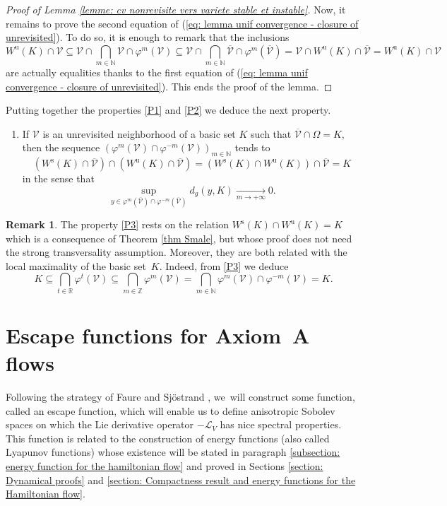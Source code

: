 \documentclass[11pt]{article}
\newcommand{\rs}{\mathrm{s}}
\newcommand{\ru}{\mathrm{u}}
\theoremstyle{definition}
\newtheorem{remark}[definition]{Remark}
\theoremstyle{plain}
\newcommand{\Lie}{\mathcal{L}}
\newcommand{\N}{\mathbb{N}}
\newcommand{\R}{\mathbb{R}}
\newcommand{\Vcal}{\mathcal{V}}
\newcommand{\Z}{\mathbb{Z}}
\begin{document}
\begin{proof}[Proof of Lemma \ref{lemme: cv nonrevisite vers variete stable et instable}]
Now, it remains to prove the second equation of (\ref{eq: lemma unif convergence - closure of unrevisited}). To do so, it is enough to remark that the inclusions
\[
W^\ru (K) \cap \Vcal \subseteq \Vcal \cap \bigcap_{m \in \N} \Vcal \cap \varphi^m (\Vcal) \subseteq \Vcal \cap \bigcap_{m \in \N} \overline{\Vcal} \cap \varphi^m (\overline{\Vcal}) =\Vcal \cap W^\ru (K) \cap \overline{\Vcal} = W^\ru (K) \cap \Vcal
\]
are actually equalities thanks to the first equation of (\ref{eq: lemma unif convergence - closure of unrevisited}). This ends the proof of the lemma.
\end{proof}

Putting together the properties \eqref{P1} and \eqref{P2} we deduce the next property.

\begin{enumerate}\renewcommand{\theenumi}{{P\arabic{enumi}}}\setcounter{enumi}{2}
\item\label{P3}
If $\Vcal$ is an unrevisited neighborhood of a basic set $K$ such that $\overline{\Vcal} \cap \Omega = K$, then the sequence $(\varphi^m (\Vcal) \cap \varphi^{-m} (\Vcal))_{m \in \N}$ tends to
\[
\left(W^\rs (K) \cap \overline{\Vcal} \right) \cap \left(W^\ru (K) \cap \overline{\Vcal} \right) = (W^\rs (K) \cap W^\ru (K))\cap \overline{\Vcal} = K
\]
in the sense that
\[
\sup_{y \in \varphi^m(\overline{\Vcal}) \cap \varphi^{-m} (\overline{\Vcal})} d_g \left(y, K \right) \underset{m \to + \infty}{\to} 0.
\]
\end{enumerate}

\begin{remark} The property \eqref{P3} rests on the relation $W^\rs (K) \cap W^\ru (K) = K$ which is a consequence of Theorem \ref{thm Smale}, but whose proof does not need the strong transversality assumption. Moreover, they are both related with the local maximality of the basic set~$K$. Indeed, from \eqref{P3} we deduce
\[
K \subseteq \bigcap_{t \in \R} \varphi^t (\Vcal) \subseteq \bigcap_{m \in \Z} \varphi^m (\Vcal) = \bigcap_{m \in \N} \varphi^m (\Vcal) \cap \varphi^{-m} (\Vcal) = K.
\]
\end{remark}

\section{Escape functions for Axiom~A flows}\label{section Escape function}

Following the strategy of Faure and Sjöstrand \cite{FS}, we~will construct some function, called an escape function, which will enable us to define anisotropic Sobolev spaces on which the Lie derivative operator $-\Lie_V$ has nice spectral properties. This function is related to the construction of energy functions (also called Lyapunov functions) whose existence will be stated in paragraph \ref{subsection: energy function for the hamiltonian flow} and proved in Sections \ref{section: Dynamical proofs} and \ref{section: Compactness result and energy functions for the Hamiltonian flow}.
\end{document}
